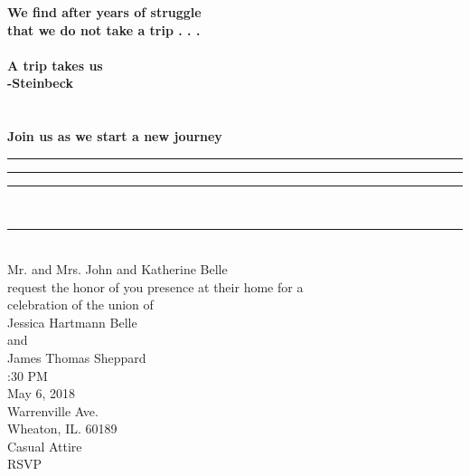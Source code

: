 \documentclass{article}
\newcommand*\NewPage{\newpage\null\thispagestyle{empty}\newpage}
\begin{document}
\bf 
\vspace*{0.7in} \hspace*{0.5in} { \noindent We find after years of struggle \\ \hspace*{1.2in} that we do not take a trip . . . } \\  \\ \hspace*{1in} {\Large A trip takes us} \\ \hspace*{2.2in} {\tiny -Steinbeck } \\ \\
\vspace*{2.2in} \\ \hspace*{1in} {\small Join us as we start a new journey } %
\clearpage
{}
\NewPage
\centering %
\rule{0.2in}{0.5in} \hspace*{1in} \rule{0.3in}{0.5in} \hspace*{1.5in} \rule{0.1in}{0.5in} {\tiny \\}
\rule{3.5in}{0.1in} %
{ \\ Mr. and Mrs. John and Katherine Belle \\
request the honor of you presence at  
their home for a \\ celebration of the union of \\ Jessica Hartmann Belle \\ and \\ James Thomas Sheppard 
\\ :30 PM \\ May 6, 2018 \\  Warrenville Ave. \\ Wheaton, IL. 60189 
\\ \bigskip Casual Attire \\ \bigskip RSVP} 

\clearpage
{}
\NewPage
\end{document}
